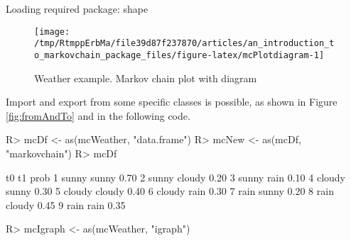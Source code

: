 \documentclass[
  nojss]{jss}
\begin{document}
\begin{CodeChunk}

\begin{CodeOutput}
Loading required package: shape
\end{CodeOutput}
\begin{figure}

{\centering \texttt{[image: /tmp/RtmppErbMa/file39d87f237870/articles/an\_introduction\_to\_markovchain\_package\_files/figure-latex/mcPlotdiagram-1]} 

}

\caption[Weather example]{Weather example. Markov chain plot with diagram}\label{fig:mcPlotdiagram}
\end{figure}
\end{CodeChunk}

Import and export from some specific classes is possible, as shown in Figure \ref{fig:fromAndTo} and in the following code.

\begin{CodeChunk}

\begin{CodeInput}
R> mcDf <- as(mcWeather, "data.frame")
R> mcNew <- as(mcDf, "markovchain")
R> mcDf
\end{CodeInput}

\begin{CodeOutput}
      t0     t1 prob
1  sunny  sunny 0.70
2  sunny cloudy 0.20
3  sunny   rain 0.10
4 cloudy  sunny 0.30
5 cloudy cloudy 0.40
6 cloudy   rain 0.30
7   rain  sunny 0.20
8   rain cloudy 0.45
9   rain   rain 0.35
\end{CodeOutput}

\begin{CodeInput}
R> mcIgraph <- as(mcWeather, "igraph")
\end{CodeInput}
\end{CodeChunk}
\end{document}
